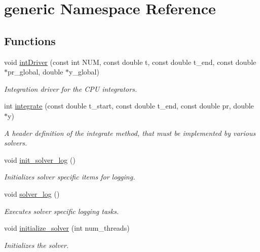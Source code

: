 \hypertarget{namespacegeneric}{}\section{generic Namespace Reference}
\label{namespacegeneric}
\subsection*{Functions}
\begin{DoxyCompactItemize}
\item 
void \hyperlink{namespacegeneric_a7560bdf00532a30210fe30b64e6d803c}{int\+Driver} (const int N\+UM, const double t, const double t\+\_\+end, const double $\ast$pr\+\_\+global, double $\ast$y\+\_\+global)
\begin{DoxyCompactList}\small\item\em Integration driver for the C\+PU integrators. \end{DoxyCompactList}\item 
int \hyperlink{namespacegeneric_a9b46bc3b376aa379ce6981bc285b442b}{integrate} (const double t\+\_\+start, const double t\+\_\+end, const double pr, double $\ast$y)
\begin{DoxyCompactList}\small\item\em A header definition of the integrate method, that must be implemented by various solvers. \end{DoxyCompactList}\item 
void \hyperlink{namespacegeneric_a262501be5ff14645a2e61d407ddde344}{init\+\_\+solver\+\_\+log} ()
\begin{DoxyCompactList}\small\item\em Initializes solver specific items for logging. \end{DoxyCompactList}\item 
void \hyperlink{namespacegeneric_af0b90d29725f8fd6ceb9338ed125aa5f}{solver\+\_\+log} ()
\begin{DoxyCompactList}\small\item\em Executes solver specific logging tasks. \end{DoxyCompactList}\item 
void \hyperlink{namespacegeneric_a82578fa45769fa8dd324e18a01f492d2}{initialize\+\_\+solver} (int num\+\_\+threads)
\begin{DoxyCompactList}\small\item\em Initializes the solver. \end{DoxyCompactList}\item 

\end{DoxyCompactItemize}
